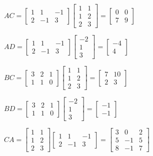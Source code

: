 \documentclass[12pt]{report}
\begin{document}
$AC = \begin{bmatrix} 1 & 1 & - 1 \\ 2 & -1 & 3 \end{bmatrix} \begin{bmatrix} 1 & 1 \\ 1 & 2 \\ 2 & 3 \end{bmatrix} = \begin{bmatrix} 0 & 0 \\ 7 & 9\end{bmatrix}$

$AD = \begin{bmatrix} 1 & 1 & - 1 \\ 2 & -1 & 3 \end{bmatrix} \begin{bmatrix} -2 \\ 1 \\ 3 \end{bmatrix} = \begin{bmatrix} -4 \\ 4\end{bmatrix}$

$BC = \begin{bmatrix} 3 & 2 & 1 \\ 1 & 1 & 0 \end{bmatrix} \begin{bmatrix} 1 & 1 \\ 1 & 2 \\ 2 & 3 \end{bmatrix} = \begin{bmatrix} 7 & 10 \\ 2 & 3 \end{bmatrix}$

$BD = \begin{bmatrix} 3 & 2 & 1 \\ 1 & 1 & 0 \end{bmatrix} \begin{bmatrix} -2 \\ 1 \\ 3 \end{bmatrix} = \begin{bmatrix} -1 \\ -1 \end{bmatrix}$

$CA = \begin{bmatrix} 1 & 1 \\ 1 & 2 \\ 2 & 3 \end{bmatrix} \begin{bmatrix} 1 & 1 & - 1 \\ 2 & -1 & 3 \end{bmatrix} = \begin{bmatrix} 3 & 0 & 2 \\ 5 & -1 & 5 \\ 8 & -1 & 7 \end{bmatrix}$
\end{document}
